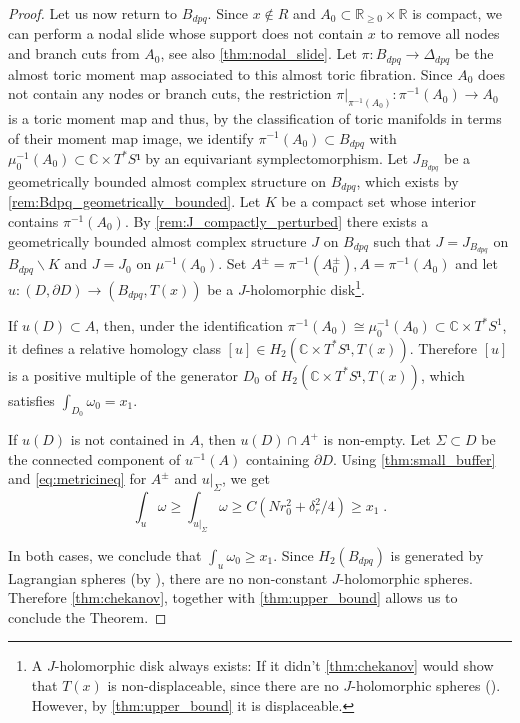 \documentclass[12pt,a4paper,draft]{scrartcl}
\begin{document}
\begin{proof}
  Let us now return to $B_{dpq}$.
  Since $x \notin R$ and $A_0 \subset \mathbb{R}_{≥ 0} \times \mathbb{R}$ is compact, we can perform a nodal slide whose support does not contain $x$ to remove all nodes and branch cuts from $A_0$, see also \cref{thm:nodal_slide}.
  Let $\pi \colon B_{dpq} \rightarrow \Delta_{dpq}$ be the almost toric moment map associated to this almost toric fibration.
  Since $A_0$ does not contain any nodes or branch cuts, the restriction $\pi\vert_{\pi^{-1}(A_0)} \colon \pi^{-1}(A_0) \rightarrow A_0$ is a toric moment map and thus, by the classification of toric manifolds in terms of their moment map image, we identify $\pi^{-1}(A_0) ⊂ B_{dpq}$ with $μ_0^{-1}(A_0) ⊂ ℂ × T^* S¹$ by an equivariant symplectomorphism.
  Let $J_{B_{dpq}}$ be a geometrically bounded almost complex structure on $B_{dpq}$, which exists by \cref{rem:Bdpq_geometrically_bounded}.
  Let $K$ be a compact set whose interior contains $π^{-1}(A_0)$.
  By \cref{rem:J_compactly_perturbed} there exists a geometrically bounded almost complex structure $J$ on $B_{dpq}$ such that $J=J_{B_{dpq}}$ on $B_{dpq} ∖ K$ and $J=J_0$ on $μ^{-1}(A_0)$.
  Set $A^± = \pi^{-1}(A_0^±), A = \pi^{-1}(A_0)$ and let $u\colon (D,∂D) → (B_{dpq}, T(x))$ be a $J$-holomorphic disk\footnote{A $J$-holomorphic disk always exists: If it didn't \cref{thm:chekanov} would show that $T(x)$ is non-displaceable, since there are no $J$-holomorphic spheres (\cite[Lemma 7.11]{evans2021atfs}).
  However, by \cref{thm:upper_bound} it is displaceable.}. 
  
  If $u(D) ⊂ A$, then, under the identification $\pi^{-1}(A_0) \cong μ_0^{-1}(A_0) \subset \mathbb{C} \times T^*S^1$, it defines a relative homology class $[u] ∈ H_2(ℂ × T^*S¹, T(x))$.
Therefore $[u]$ is a positive multiple of the generator $D_0$ of $H_2(ℂ × T^*S¹, T(x))$, which satisfies $∫_{D_0} ω_0 = x_1$.
  
  If $u(D)$ is not contained in $A$, then $u(D) ∩ A^+$ is non-empty.
Let $Σ ⊂ D$ be the connected component of $u^{-1}(A)$ containing $∂D$.
Using \cref{thm:small_buffer} and \eqref{eq:metricineq} for $A^±$ and $u|_Σ$, we get
  \[∫_u ω ≥ ∫_{u|_Σ} ω ≥ C(Nr_0^2 + δ_r^2/4) ≥ x_1 \;. \]

    In both cases, we conclude that $∫_{u} ω_0 ≥ x_1$.
    Since $H_2(B_{dpq})$ is generated by Lagrangian spheres (by \cite[Lemma 7.11]{evans2021atfs}), there are no non-constant $J$-holomorphic spheres.
    Therefore \cref{thm:chekanov}, together with \cref{thm:upper_bound} allows us to conclude the Theorem.
\end{proof}
\end{document}
